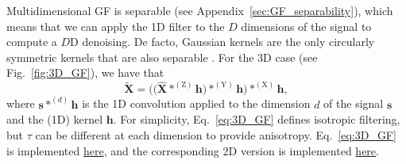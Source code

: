 \documentclass{article}
\begin{document}
Multidimensional GF is separable (see
Appendix~\ref{sec:GF_separability}), which means that we can apply the
1D filter to the $D$ dimensions of the signal to compute a $D$D
denoising. De facto, Gaussian kernels are the only circularly
symmetric kernels that are also separable
\cite{gonzalez1992digital}. For the 3D case (see
Fig.~\ref{fig:3D_GF}), we have that
\begin{equation}
  \tilde{\mathbf{X}} = \Big(\big(\hat{\mathbf X}*^{(\text{Z})}{\mathbf h}\big)*^{(\text{Y})}{\mathbf h}\Big)*^{(\text{X})}{\mathbf h},
    \label{eq:3D_GF}
\end{equation}
where ${\mathbf s}*^{(d)}{\mathbf h}$ is the 1D convolution applied to
the dimension $d$ of the signal ${\mathbf s}$ and the (1D) kernel
${\mathbf h}$. For simplicity, Eq.~\ref{eq:3D_GF} defines isotropic
filtering, but $\tau$ can be different at each dimension to provide
anisotropy. Eq.~\ref{eq:3D_GF} is implemented
\href{https://github.com/vicente-gonzalez-ruiz/denoising/blob/main/src/denoising/volume/gaussian.py}{here},
and the corresponding 2D version is implemented
\href{https://github.com/vicente-gonzalez-ruiz/denoising/blob/main/src/denoising/image/gaussian.py}{here}.
\end{document}
